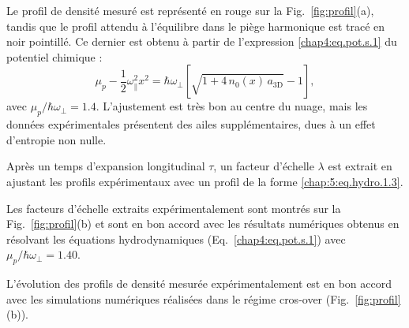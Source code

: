 Le profil de densité mesuré est représenté en rouge sur la Fig.~\ref{fig:profil}(a), tandis que le profil attendu à l'équilibre dans le piège harmonique est tracé en noir pointillé. Ce dernier est obtenu à partir de l'expression \eqref{chap4:eq.pot.s.1} du potentiel chimique :
\begin{equation}\label{chap:eq:ajust}
\mu_p - \frac{1}{2} \omega_\parallel^2 x^2
= \hbar \omega_\perp \left[ \sqrt{ 1 + 4\, n_0(x)\, a_\mathrm{3D}}-1 \right],
\end{equation}
avec $\mu_p / \hbar \omega_\perp = 1.4$. L'ajustement est très bon au centre du nuage, mais les données expérimentales présentent des ailes supplémentaires, dues à un effet d'entropie non nulle.  

Après un temps d'expansion longitudinal $\tau$, un facteur d'échelle $\lambda$ est extrait en ajustant les profils expérimentaux avec un profil de la forme \eqref{chap:5:eq.hydro.1.3}.

Les facteurs d'échelle extraits expérimentalement sont montrés sur la Fig.~\ref{fig:profil}(b) et sont en bon accord avec les résultats numériques obtenus en résolvant les équations hydrodynamiques (Eq.~\eqref{chap4:eq.pot.s.1}) avec $\mu_p / \hbar \omega_\perp = 1.40$.

\medskip

L'évolution des profils de densité mesurée expérimentalement est en bon accord avec les simulations numériques réalisées dans le régime cros-over (Fig.~\ref{fig:profil}(b)).


